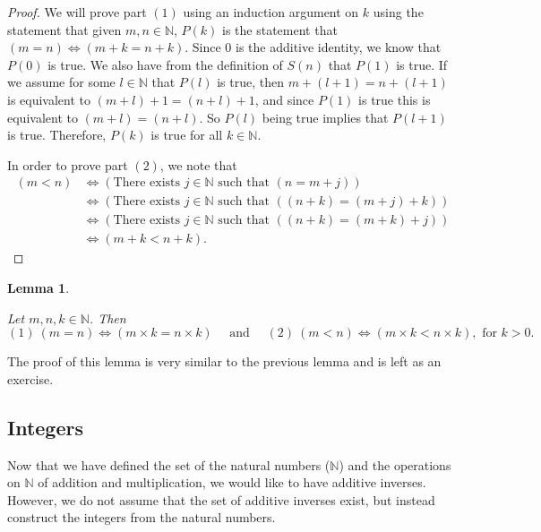 \documentclass[
]{book}
\newtheorem{lemma}{Lemma}[chapter]
\theoremstyle{definition}
\theoremstyle{definition}
\theoremstyle{definition}
\theoremstyle{definition}
\theoremstyle{remark}
\begin{document}
\begin{proof}

We will prove part \((1)\) using an induction argument on \(k\) using the statement that given \(m,n\in \mathbb{N}\), \(P(k)\) is the statement that \((m=n) \Leftrightarrow (m+k=n+k)\). Since \(0\) is the additive identity, we know that \(P(0)\) is true. We also have from the definition of \(S(n)\) that \(P(1)\) is true. If we assume for some \(l\in \mathbb{N}\) that \(P(l)\) is true, then \(m+(l+1) = n+(l+1)\) is equivalent to \((m+l)+1 = (n+l)+1\), and since \(P(1)\) is true this is equivalent to \((m+l)=(n+l)\). So \(P(l)\) being true implies that \(P(l+1)\) is true. Therefore, \(P(k)\) is true for all \(k\in \mathbb{N}\).

In order to prove part \((2)\), we note that
\begin{align*}
    (m<n) &\Leftrightarrow (\mbox{There exists } j\in \mathbb{N} \mbox{ such that } (n=m+j)) \\
    &\Leftrightarrow (\mbox{There exists } j\in \mathbb{N} \mbox{ such that } ((n+k)=(m+j)+k)) \\
    &\Leftrightarrow (\mbox{There exists } j\in \mathbb{N} \mbox{ such that } ((n+k)=(m+k)+j)) \\
    &\Leftrightarrow (m+k<n+k).        
\end{align*}

\end{proof}

\begin{lemma}
\protect\hypertarget{lem:order-multiplication-naturals}{}\label{lem:order-multiplication-naturals}

Let \(m,n,k\in \mathbb{N}\). Then \[ (1) \: (m=n) \Leftrightarrow (m\times k=n\times k) \quad \mbox{ and } \quad (2) \: (m<n) \Leftrightarrow (m\times k<n\times k), \mbox{ for } k>0.\]

\end{lemma}

The proof of this lemma is very similar to the previous lemma and is left as an exercise.

\hypertarget{integers}{%
\subsection{Integers}\label{integers}}

Now that we have defined the set of the natural numbers (\(\mathbb{N}\)) and the operations on \(\mathbb{N}\) of addition and multiplication, we would like to have additive inverses. However, we do not assume that the set of additive inverses exist, but instead construct the integers from the natural numbers.
\end{document}
